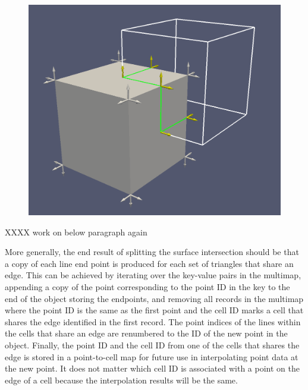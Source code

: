 \documentclass{InsightArticle}
\begin{document}
\begin{figure}
\centering
\includegraphics[scale=0.25]{Figures/BoxNormals}
\label{fig:BoxNormals}
\end{figure}

XXXX work on below paragraph again

More generally, the end result of splitting the surface intersection should be that a copy of each line end point is produced for each set of triangles that share an edge. This can be achieved by iterating over the key-value pairs in the multimap, appending a copy of the point corresponding to the point ID in the key to the end of the  object storing the endpoints, and removing all records in the multimap where the point ID is the same as the first point and the cell ID marks a cell that shares the edge identified in the first record. The point indices of the lines within the cells that share an edge are renumbered to the ID of the new point in the  object. Finally, the point ID and the cell ID from one of the cells that shares the edge is stored in a point-to-cell map for future use in interpolating point data at the new point. It does not matter which cell ID is associated with a point on the edge of a cell because the interpolation results will be the same.
\end{document}
